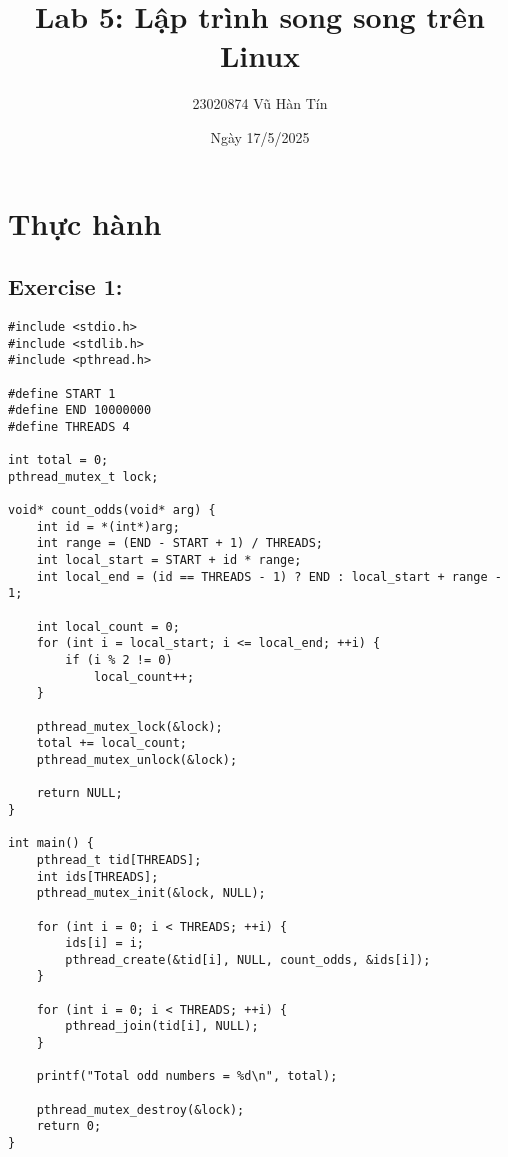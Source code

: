 \documentclass{article}
\title{Lab 5: Lập trình song song trên Linux
}
\author{23020874 Vũ Hàn Tín}
\date{Ngày 17/5/2025}
\begin{document}
\maketitle
\section*{Thực hành}
\subsection*{Exercise 1:}
\begin{verbatim}
#include <stdio.h>
#include <stdlib.h>
#include <pthread.h>

#define START 1
#define END 10000000
#define THREADS 4

int total = 0;
pthread_mutex_t lock;

void* count_odds(void* arg) {
    int id = *(int*)arg;
    int range = (END - START + 1) / THREADS;
    int local_start = START + id * range;
    int local_end = (id == THREADS - 1) ? END : local_start + range - 1;

    int local_count = 0;
    for (int i = local_start; i <= local_end; ++i) {
        if (i % 2 != 0)
            local_count++;
    }

    pthread_mutex_lock(&lock);
    total += local_count;
    pthread_mutex_unlock(&lock);

    return NULL;
}

int main() {
    pthread_t tid[THREADS];
    int ids[THREADS];
    pthread_mutex_init(&lock, NULL);

    for (int i = 0; i < THREADS; ++i) {
        ids[i] = i;
        pthread_create(&tid[i], NULL, count_odds, &ids[i]);
    }

    for (int i = 0; i < THREADS; ++i) {
        pthread_join(tid[i], NULL);
    }

    printf("Total odd numbers = %d\n", total);

    pthread_mutex_destroy(&lock);
    return 0;
}
\end{verbatim}
\end{document}

